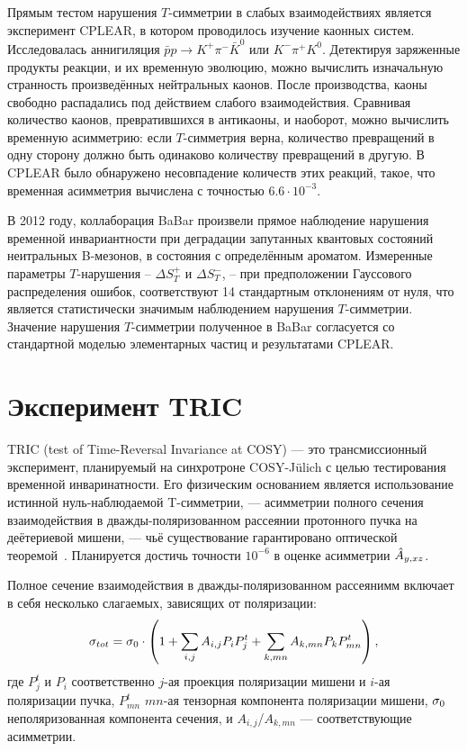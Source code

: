 \documentclass{article}
\begin{document}
	Прямым тестом нарушения $T$-симметрии в слабых взаимодействиях является эксперимент CPLEAR, в котором проводилось изучение каонных систем.~\cite{CPLEAR} Исследовалась аннигиляция $\bar{p}p \to K^+ \pi^- \bar{K}^0$ или $K^- \pi^+ K^0$. Детектируя заряженные продукты реакции, и их временную эволюцию, можно вычислить изначальную странность произведённых нейтральных каонов. После производства, каоны свободно распадались под действием слабого взаимодействия. Сравнивая количество каонов, превратившихся в антикаоны, и наоборот, можно вычислить временную асимметрию: если $T$-симметрия верна, количество превращений в одну сторону должно быть одинаково количеству превращений в другую.
	В CPLEAR было обнаружено несовпадение количеств этих реакций, такое, что временная асимметрия вычислена с точностью $6.6\cdot 10^{-3}$.
	
	В 2012 году, коллаборация BaBar произвели прямое наблюдение нарушения временной инвариантности при деградации запутанных квантовых состояний неитральных B-мезонов, в состояния с определённым ароматом. Измеренные параметры $T$-нарушения -- $\Delta S_T^+$ и $\Delta S_T^-$, -- при предположении Гауссового распределения ошибок, соответствуют 14 стандартным отклонениям от нуля, что является статистически значимым наблюдением нарушения $T$-симметрии.~\cite{BaBar} Значение нарушения $T$-симметрии полученное в BaBar согласуется со стандартной моделью элементарных частиц и результатами CPLEAR.
	
	\section{Эксперимент TRIC}
	
	TRIC (test of Time-Reversal Invariance at COSY) --- это трансмиссионный эксперимент, планируемый на синхротроне COSY-J\"ulich с целью тестирования временной инваринатности. Его физическим основанием является использование истинной нуль-наблюдаемой T-симметрии, --- асимметрии полного сечения взаимодействия в дважды-поляризованном рассеянии протонного пучка на деётериевой мишени, --- чьё существование гарантировано оптической теоремой~\cite{Conzett}. Планируется достичь точности $10^{-6}$ в оценке асимметрии $\Ayxz*$.
	
	Полное сечение взаимодействия в дважды-поляризованном рассеянимм включает в себя несколько слагаемых, зависящих от поляризации:
	\begin{equation}\label{eq:PolCS}
	\CS[tot] = \CS[0]\cdot\bkt{1 + \sum_{i,j} A_{i,j} P_iP^t_j + \sum_{k, mn} A_{k,mn}P_k P^t_{mn}},
	\end{equation}
	где $P^t_j$ и $P_i$ соответственно $j$-ая проекция поляризации мишени и $i$-ая поляризации пучка, $P^t_{mn}$ $mn$-ая тензорная компонента поляризации мишени, $\CS[0]$ неполяризованная компонента сечения, и $A_{i,j}$/$A_{k,mn}$ --- соответствующие асимметрии.
	
\end{document}
